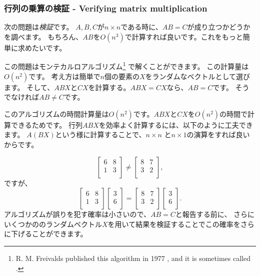 \subsubsection{行列の乗算の検証 - Verifying matrix multiplication}



次の問題は\emph{検証}です。
$A,B,C$が$n \times n$である時に、$AB=C$が成り立つかどうかを調べます。
もちろん、$AB$を$O(n^3)$で計算すれば良いです。これをもっと簡単に求めたいです。

この問題はモンテカルロアルゴリズム\footnote{R. M. Freivalds published
this algorithm in 1977 \cite{fre77}, and it is sometimes
called  .}
で解くことができます。
この計算量は$O(n^2)$です。
考え方は簡単で$n$個の要素の$X$をランダムなベクトルとして選びます。
そして、$ABX$と$CX$を計算する。$ABX=CX$なら、$AB=C$です。
そうでなければ$AB \neq C$です。

このアルゴリズムの時間計算量は$O(n^2)$です。$ABX$と$CX$を$O(n^2)$の時間で計算できるためです。
行列$ABX$を効率よく計算するには、以下のように工夫できます。
$A(BX)$という様に計算することで、$n \times n$ と$n \times 1$の演算をすれば良いからです。

\[
 \begin{bmatrix}
  6 & 8 \\
  1 & 3 \\
 \end{bmatrix}
\neq
 \begin{bmatrix}
  8 & 7 \\
  3 & 2 \\
 \end{bmatrix},
\]
ですが、
\[
 \begin{bmatrix}
  6 & 8 \\
  1 & 3 \\
 \end{bmatrix}
 \begin{bmatrix}
  3 \\
  6 \\
 \end{bmatrix}
=
 \begin{bmatrix}
  8 & 7 \\
  3 & 2 \\
 \end{bmatrix}
 \begin{bmatrix}
  3 \\
  6 \\
 \end{bmatrix}.
\]
アルゴリズムが誤りを犯す確率は小さいので、$AB=C$と報告する前に、
さらにいくつかののランダムベクトル$X$を用いて結果を検証することでこの確率をさらに下げることができます。

